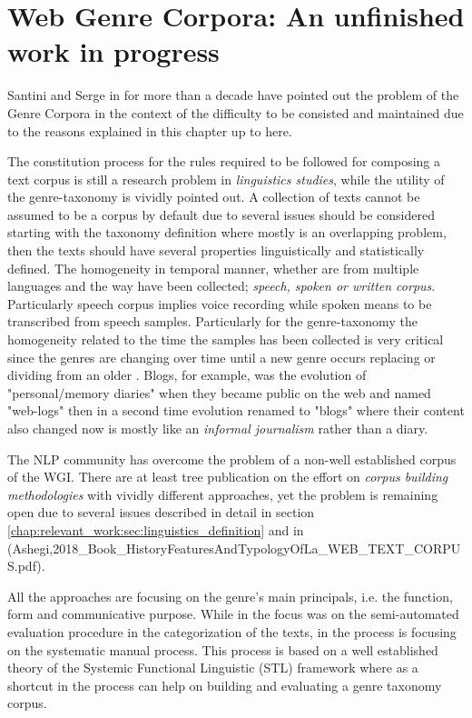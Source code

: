 \section{Web Genre Corpora: An unfinished work in progress}\label{chap:relevant_work:sec:intro}

Santini and Serge in \parencite{santini2009web} for more than a decade have pointed out the problem of the Genre Corpora in the context of the difficulty to be consisted and maintained due to the reasons explained in this chapter up to here. 

The constitution process for the rules required to be followed for composing a text corpus is still a research problem in \textit{linguistics studies}, while the utility of the genre-taxonomy is vividly pointed out. A collection of texts cannot be assumed to be a corpus by default due to several issues should be considered starting with the taxonomy definition where mostly is an overlapping problem, then the texts should have several properties linguistically and statistically defined. The homogeneity in temporal manner, whether are from multiple languages and the way have been collected; \textit{speech, spoken or written corpus}. Particularly speech corpus implies voice recording while spoken means to be transcribed from speech samples. Particularly for the genre-taxonomy the homogeneity related to the time the samples has been collected is very critical since the genres are changing over time until a new genre occurs replacing or dividing from an older \parencite{dash2018history}. Blogs, for example, was the evolution of "personal/memory diaries" when they became public on the web and named "web-logs" then in a second time evolution renamed to "blogs" where their content also changed now is mostly like an \textit{informal journalism} rather than a diary.

The NLP community has overcome the problem of a non-well established corpus of the WGI. There are at least tree publication on the effort on \textit{corpus building methodologies} with vividly different approaches, yet the problem is remaining open due to several issues described in detail in section \ref{chap:relevant_work:sec:linguistics_definition} and in \parencite{melissourgou2017genre,asheghi2014semi} (Ashegi,2018_Book_HistoryFeaturesAndTypologyOfLa_WEB_TEXT_CORPUS.pdf). 

All the approaches are focusing on the genre's main principals, i.e. the function, form and communicative purpose. While in \parencite{asheghi2014semi} the focus was on the semi-automated evaluation procedure in the categorization of the texts, in \parencite{melissourgou2017genre} the process is focusing on the systematic manual process. This process is based on a well established theory of  the Systemic Functional Linguistic (STL) framework where as a shortcut in the process can help on building and evaluating a genre taxonomy corpus. 

